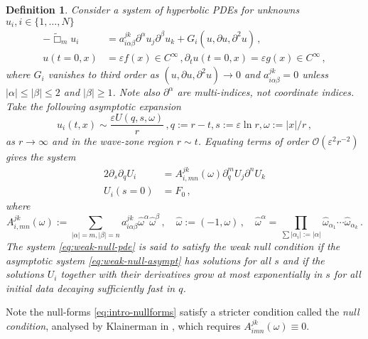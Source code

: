 \documentclass[11pt, a4paper]{amsart}
\numberwithin{equation}{section}
\newtheorem{definition}[theorem]{Definition}
\numberwithin{theorem}{section}
\newcommand{\p}{\partial}
\newcommand{\tbox}{\widetilde{\Box}}
\begin{document}
\begin{definition}
Consider a system of hyperbolic PDEs for unknowns $u_i, i \in \{1, \ldots, N \}$
\begin{equation} \begin{split}
 - \tbox_m u_i &= a^{jk}_{i \alpha \beta} \p^\alpha u_j \p^\beta u_k + G_i (u, \p u, \p^2 u) \,, \\
 u(t=0,x) &= \varepsilon f(x) \in C^\infty \,, \p_t u(t=0,x) = \varepsilon g (x) \in C^\infty  \,,
 \end{split} \label{eq:weak-null-pde}\end{equation}
where $G_i$ vanishes to third order as $(u, \p u, \p^2 u) \to 0$ and $a^{jk}_{i \alpha \beta}  = 0$ unless $\vert \alpha \vert \leq \vert \beta \vert \leq 2$ and $ \vert \beta \vert \geq 1$. Note also $\p^\alpha$ are multi-indices, not coordinate indices. 
Take the following asymptotic expansion 
\begin{equation} u_i(t,x) \sim \frac{\varepsilon U(q,s,\omega)}{r} \,, q := r-t, s:= \varepsilon \ln r, \omega := \vert x \vert / r \,, \label{eq:weak-null-exp} \end{equation}
as $r \to \infty$ and in the wave-zone region $r \sim t$.
Equating terms of order $\mathcal{O}(\varepsilon^2 r^{-2})$ gives the system
\begin{equation} \begin{split}
2 \p_s \p_q U_i &= A^{jk}_{i, mn} (\omega) \p_q ^m U_j \p^n U_k \\
U_i(s=0) &= F_0 \,, \label{eq:weak-null-asympt}
\end{split} \end{equation}
where
$$ A^{jk}_{i, m n}  (\omega) := \sum_{\vert \alpha \vert = m, \vert \beta \vert = n} a^{jk}_{i \alpha \beta}  \hat{\omega}^\alpha \hat{\omega}^\beta \,, \quad \hat{\omega} := (-1, \omega) \,, \quad \hat{\omega}^\alpha = \prod_{\sum \vert \alpha_i \vert := \vert \alpha \vert } \hat{\omega}_{\alpha_1} \cdots \hat{\omega}_{\alpha_k} \,.$$
The system \eqref{eq:weak-null-pde} is said to satisfy the weak null condition if the asymptotic system \eqref{eq:weak-null-asympt} has solutions for all $s$ and if the solutions $U_i$ together with their derivatives grow at most exponentially in $s$ for all initial data decaying sufficiently fast in $q$. 
\end{definition}

Note the null-forms \eqref{eq:intro-nullforms} satisfy a stricter condition called the \textit{null condition}, analysed by Klainerman in \cite{MR837683}, which requires $ A^{jk}_{i mn} (\omega) \equiv 0$.
\end{document}
